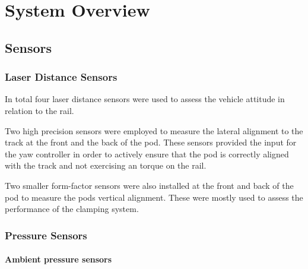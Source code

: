 
\chapter{System Overview}

\section{Sensors}


\subsection{Laser Distance Sensors}

In total four laser distance sensors were used to assess the vehicle attitude in relation to the rail.

Two high precision sensors were employed to measure the lateral alignment to the track at the front and the back of the pod. These sensors provided the input for the yaw controller in order to actively ensure that the pod is correctly aligned with the track and not exercising an torque on the rail.

Two smaller form-factor sensors were also installed at the front and back of the pod to measure the pods vertical alignment. These were mostly used to assess the performance of the clamping system.

\subsection{Pressure Sensors}

\subsubsection{Ambient pressure sensors}

